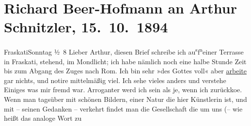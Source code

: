 

               \section[Richard Beer-Hofmann an Arthur Schnitzler, 15. 10. 1894]{ Richard Beer-Hofmann an Arthur Schnitzler, 15. 10. 1894}\nopagebreak{}\rehead{ }\begin{ledgroupsized}[t]{13cm}\normalsize\beginnumbering{} \toendnotes[C]{\smallbreak\pagebreak[2]} 
\toendnotes[C]{\smallbreak}\pstart
           \raggedleft{}{\pb}FraskatiSonntag{ }½ 8\pend
           \pstart
           {\pb}Lieber Arthur, diesen Brief schreibe ich au\substVorne{}\textsuperscript{s}\substDazwischen{}f\substHinten{}{ }\substVorne{}\textsuperscript{a}\substDazwischen{}e\substHinten{}iner Terrasse  in Fraskati, stehend, im Mondlicht; ich habe nämlich noch eine halbe
               Stunde Zeit bis zum Abgang des Zuges nach Rom.
                  {\pb}Ich bin sehr »des Gottes voll« aber \uline{arbeite}
               gar nichts, und notire mittelmäßig viel. Ich sehe vieles anders und verstehe Einiges
               was mir fremd war. Arroganter werd ich {\pb}sein als je, wenn ich zurückko{\geminationm}e. Wenn man tagsüber mit schönen Bildern, einer Natur
               die hier Künstlerin ist, und mit – seinen Gedanken – verkehrt {\pb}findet man die Gesellschaft die um
               uns (– wie heißt das analoge Wort zu\pend
           \settowidth{\longeste}{crepiren!}\settowidth{\longestz}{–}\settowidth{\longestd}{sterben}\settowidth{\longestv}{}\settowidth{\longestf}{}\addtolength\longeste{1em}

\end{ledgroupsized}
